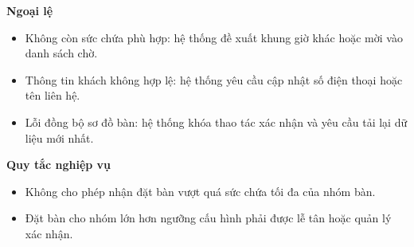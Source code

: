 \documentclass[11pt,a4paper]{article}
\begin{document}
\begin{usecasebox}[title={UC-RES-01 --- Tạo đặt bàn}]
    \textbf{Ngoại lệ}
    \begin{itemize}[leftmargin=1.8em]
  \item Không còn sức chứa phù hợp: hệ thống đề xuất khung giờ khác hoặc mời vào danh sách chờ.
  \item Thông tin khách không hợp lệ: hệ thống yêu cầu cập nhật số điện thoại hoặc tên liên hệ.
  \item Lỗi đồng bộ sơ đồ bàn: hệ thống khóa thao tác xác nhận và yêu cầu tải lại dữ liệu mới nhất.
\end{itemize}

    \textbf{Quy tắc nghiệp vụ}
    \begin{itemize}[leftmargin=1.8em]
  \item Không cho phép nhận đặt bàn vượt quá sức chứa tối đa của nhóm bàn.
  \item Đặt bàn cho nhóm lớn hơn ngưỡng cấu hình phải được lễ tân hoặc quản lý xác nhận.
\end{itemize}
    \end{usecasebox}
\end{document}
